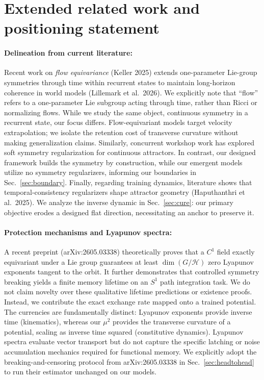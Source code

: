 \documentclass{article}
\begin{document}
\appendix

\section{Extended related work and positioning statement}
\label{app:relpos}
\paragraph{Delineation from current literature:} Recent work on \emph{flow equivariance} (Keller 2025) extends one-parameter Lie-group symmetries through time within recurrent states to maintain long-horizon coherence in world models (Lillemark et al.\ 2026). We explicitly note that ``flow'' refers to a one-parameter Lie subgroup acting through time, rather than Ricci or normalizing flows. While we study the same object, continuous symmetry in a recurrent state, our focus differs. Flow-equivariant models target velocity extrapolation; we isolate the retention cost of transverse curvature without making generalization claims. Similarly, concurrent workshop work has explored soft symmetry regularization for continuous attractors. In contrast, our designed framework builds the symmetry by construction, while our emergent models utilize no symmetry regularizers, informing our boundaries in Sec.~\ref{sec:boundary}. Finally, regarding training dynamics, literature shows that temporal-consistency regularizers shape attractor geometry (Haputhanthri et al.\ 2025). We analyze the inverse dynamic in Sec.~\ref{sec:cure}: our primary objective erodes a designed flat direction, necessitating an anchor to preserve it.

\paragraph{Protection mechanisms and Lyapunov spectra:} A recent preprint (arXiv:2605.03338) theoretically proves that a $C^1$ field exactly equivariant under a Lie group guarantees at least $\dim(G/\mathcal H)$ zero Lyapunov exponents tangent to the orbit. It further demonstrates that controlled symmetry breaking yields a finite memory lifetime on an $S^1$ path integration task. We do not claim novelty over these qualitative lifetime predictions or existence proofs. Instead, we contribute the exact exchange rate mapped onto a trained potential. The currencies are fundamentally distinct: Lyapunov exponents provide inverse time (kinematics), whereas our $\mu^2$ provides the transverse curvature of a potential, scaling as inverse time squared (constitutive dynamics). Lyapunov spectra evaluate vector transport but do not capture the specific latching or noise accumulation mechanics required for functional memory. We explicitly adopt the breaking-and-censoring protocol from arXiv:2605.03338 in Sec.~\ref{sec:headtohead} to run their estimator unchanged on our models.
\end{document}
